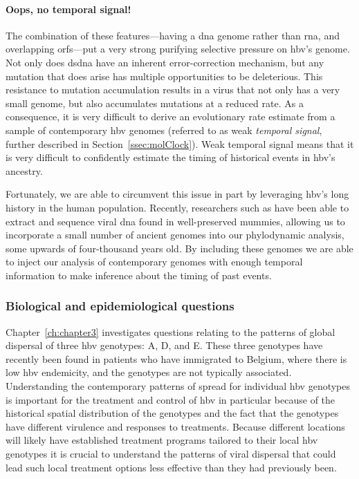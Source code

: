 \paragraph*{Oops, no temporal signal!}
The combination of these features---having a \gls{dna} genome rather than \gls{rna}, and overlapping \gls{orf}s---put a very strong purifying selective pressure on \gls{hbv}'s genome.
Not only does ds\gls{dna} have an inherent error-correction mechanism, but any mutation that does arise has multiple opportunities to be deleterious.
This resistance to mutation accumulation results in a virus that not only has a very small genome, but also accumulates mutations at a reduced rate.
As a consequence, it is very difficult to derive an evolutionary rate estimate from a sample of contemporary \gls{hbv} genomes (referred to as weak \textit{temporal signal}, further described in Section~\ref{ssec:molClock}).
Weak temporal signal means that it is very difficult to confidently estimate the timing of historical events in \gls{hbv}'s ancestry.

Fortunately, we are able to circumvent this issue in part by leveraging \gls{hbv}'s long history in the human population.
Recently, researchers such as \citet{muhlemann2018ancient} have been able to extract and sequence viral \gls{dna} found in well-preserved mummies, allowing us to incorporate a small number of ancient genomes into our phylodynamic analysis, some upwards of four-thousand years old.
By including these genomes we are able to inject our analysis of contemporary genomes with enough temporal information to make inference about the timing of past events.

\subsubsection{Biological and epidemiological questions}
Chapter~\ref{ch:chapter3} investigates questions relating to the patterns of global dispersal of three \gls{hbv} genotypes: A, D, and E.
These three genotypes have recently been found in patients who have immigrated to Belgium, where there is low \gls{hbv} endemicity, and the genotypes are not typically associated.
Understanding the contemporary patterns of spread for individual \gls{hbv} genotypes is important for the treatment and control of \gls{hbv} in particular because of the historical spatial distribution of the genotypes and the fact that the genotypes have different virulence and responses to treatments.
Because different locations will likely have established treatment programs tailored to their local \gls{hbv} genotypes it is crucial to understand the patterns of viral dispersal that could lead such local treatment options less effective than they had previously been.

